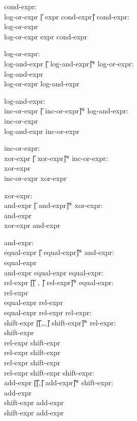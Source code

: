 \begin{center}
\PAIR
{
cond-expr:\\
\>	log-or-expr \U{[} expr \T{:} cond-expr\U{]}
}
{
cond-expr:\\
\>	log-or-expr\\
\>	log-or-expr  expr \T{:} cond-expr
}

\PAIR
{
log-or-expr:\\
\>	log-and-expr \U{[}\T{||} log-and-expr\U{]}*
}
{
log-or-expr:\\
\>	log-and-expr\\
\>	log-or-expr \T{||} log-and-expr
}



\PAIR
{
log-and-expr:\\
\>	inc-or-expr \U{[}\T{\&\&} inc-or-expr\U{]}*
}
{
log-and-expr:\\
\>	inc-or-expr\\
\>	log-and-expr \T{\&\&} inc-or-expr
}

\PAIR
{
inc-or-expr:\\
\>	xor-expr \U{[}\T{|} xor-expr\U{]}*
}
{
inc-or-expr:\\
\>	xor-expr\\
\>	inc-or-expr \T{|} xor-expr
}


\PAIR
{
xor-expr:\\
\>	and-expr \U{[}\T{\circumflex} and-expr\U{]}*
}
{
xor-expr:\\
\>	and-expr\\
\>	xor-expr \T{\circumflex} and-expr
}



\PAIR
{
and-expr:\\
\>	equal-expr \U{[}\T{\&} equal-expr\U{]}*
}
{
and-expr:\\
\>	equal-expr\\
\>	and-expr \T{\&} equal-expr
}
\PAIR
{
equal-expr:\\
\>	rel-expr \U{[}\U{[}\T{==} , \T{!=}\U{]} rel-expr\U{]}*
}
{
equal-expr:\\
\>	rel-expr\\
\>	equal-expr \T{==} rel-expr\\
\>	equal-expr \T{!=} rel-expr
}
\PAIR
{
rel-expr:\\
\>         shift-expr \U{[}\U{[}\T{>},\T{<},\T{<=},\T{>=}\U{]} shift-expr\U{]}*
}
{
rel-expr:\\
\>	shift-expr\\
\>	rel-expr \T{<} shift-expr\\
\>	rel-expr \T{>} shift-expr\\
\>	rel-expr \T{<=} shift-expr\\
\>	rel-expr \T{>=} shift-expr
}
\PAIR
{
shift-expr: \\
\>	add-expr \U{[}\U{[}\T{<<},\T{>>}\U{]} add-expr\U{]}*
}
{
shift-expr: \\
\>	add-expr\\
\>	shift-expr \T{<<} add-expr\\
\>	shift-expr \T{>>} add-expr
}


\end{center}
